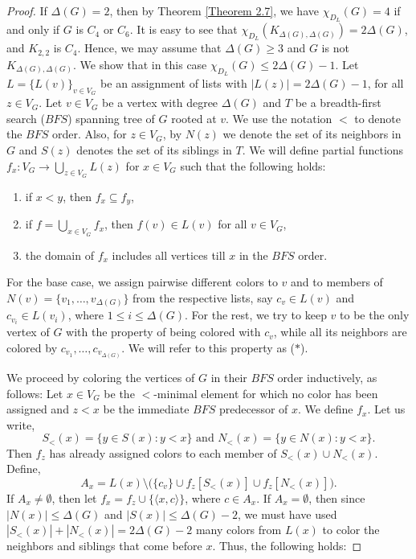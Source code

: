 \documentclass[10pt,a4paper]{amsart}
\begin{document}
\begin{proof}
   If $\Delta(G)=2$, then by Theorem \ref{Theorem 2.7}, we have $\chi_{D_L}(G) = 4$ if and only if $G$ is $C_4$ or $C_6$. It is easy to see that $\chi_{D_L}(K_{\Delta(G),\Delta(G)}) = 2\Delta(G)$, and $K_{2,2}$ is $C_4$. Hence, we may assume that $\Delta(G) \geq 3$ and $G$ is not $K_{\Delta(G),\Delta(G)}$. We show that in this case $\chi_{D_L}(G) \leq 2\Delta(G)-1$. Let $L=\{L(v)\}_{v\in V_G}$ be an assignment of lists with $|L(z)| = 2\Delta(G)-1$, for all $z\in V_G$. 
   Let $v\in V_G$ be a vertex with degree $\Delta(G)$ and $T$ be a breadth-first search ($BFS$) spanning tree of $G$ rooted at $v$. We use the notation $<$ to denote the $BFS$ order. Also, for $z\in V_{G}$, by $N(z)$ we denote the set of its neighbors in $G$ and $S(z)$ denotes the set of its siblings in $T$. We will define partial functions $f_x: V_{G} \to \bigcup_{z\in V_{G}}L(z)$ for $x\in V_{G}$ such that the following holds: 
\begin{enumerate}
    \item[(i)] if $x < y$, then $f_x\subseteq f_y$,
    \item[(ii)] if $f=\bigcup_{x\in V_{G}} f_x$, then $f(v)\in L(v)$ for all $v\in V_{G}$,
    
    \item[(iii)] the domain of $f_{x}$ includes all vertices till $x$ in the $BFS$ order.
\end{enumerate}
For the base case, we assign pairwise different colors to $v$ and to members of $N(v) = \{v_1,\dots, v_{\Delta(G)}\}$ from the respective lists, say $c_v\in L(v)$ and $c_{v_i}\in L(v_i)$, where $1\leq i\leq \Delta(G)$. 
For the rest, we try to keep $v$ to be the only vertex of $G$ with the property of being colored with $c_v$, while all its neighbors are colored by $c_{v_1},\dots, c_{v_{\Delta(G)}}$. We will refer to this property as ($\ast$). 

We proceed by coloring the vertices of $G$ in their $BFS$ order inductively, as follows: Let $x\in V_{G}$ be the $<$-minimal element for which no color has been assigned and $z<x$ be the immediate $BFS$ predecessor of $x$. We define $f_x$. Let us write,
$$
    S_<(x) = \{y\in S(x): y<x\} \text{ and } N_<(x) = \{y\in N(x): y<x\}.
$$
Then $f_z$ has already assigned colors to each member of $S_<(x) \cup N_<(x)$. Define,
$$
A_x= L(x)\setminus \Big(\{c_v\} \cup f_z[S_<(x)] \cup f_z[N_<(x)]\Big).
$$
If $A_{x} \neq \emptyset$, then let $f_x = f_z \cup \{\langle x, c \rangle\} $,
where $c\in A_x$. If $A_x=\emptyset$, then since $|N(x)| \leq \Delta(G)$ and $|S(x)|\leq \Delta(G)-2$, we must have used $|S_<(x)| + |N_<(x)| = 2\Delta(G) -2$ many colors from $L(x)$ to color the neighbors and siblings that come before $x$. Thus, the following holds: 


\end{proof}
\end{document}
